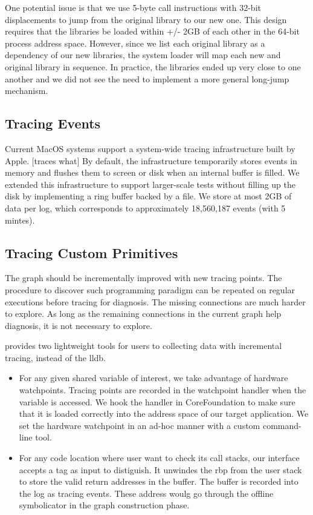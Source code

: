One potential issue is that we use 5-byte call instructions with 32-bit displacements to jump from the original library to our new one.
This design requires that the libraries be loaded within +/- 2GB of each other in the 64-bit process address space.
However, since we list each original library as a dependency of our new libraries, the system loader will map each new and original library in sequence.
In practice, the libraries ended up very close to one another and we did not see the need to implement a more general long-jump mechanism.

\subsection{Tracing Events}
Current MacOS systems support a system-wide tracing infrastructure built by Apple. [traces what]
By default, the infrastructure temporarily stores events in memory and flushes them to screen or disk when an internal buffer is filled.
We extended this infrastructure to support larger-scale tests without filling up the disk by implementing a ring buffer backed by a file.
We store at most 2GB of data per log, which corresponds to approximately 18,560,187 events (with 5 mintes).

\subsection{Tracing Custom Primitives}
The graph should be incrementally improved with new tracing points.
The procedure to discover such programming paradigm can be repeated on regular executions before tracing for diagnosis.
The missing connections are much harder to explore.
As long as the remaining connections in the current graph help diagnosis, it is not necessary to explore.

\xxx provides two lightweight tools for users to collecting data with incremental tracing, instead of the lldb.
\begin {itemize}
\item For any given shared variable of interest, we take advantage of hardware watchpoints.
	Tracing points are recorded in the watchpoint handler when the variable is accessed.
	We hook the handler in CoreFoundation to make sure that it is loaded correctly into the address space of our target application.
	We set the hardware watchpoint in an ad-hoc manner with a custom command-line tool.
\item For any code location where user want to check its call stacks, our interface accepts a tag as input to distiguish.
	It unwindes the rbp from the user stack to store the valid return addresses in the buffer. The buffer is recorded into the log as tracing events.
	These address woulg go through the offline symbolicator in the graph construction phase.
\end{itemize}

